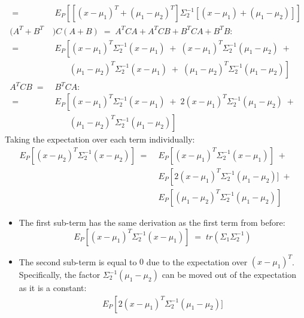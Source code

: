 \documentclass[12pt]{report}
\begin{document}
\begin{itemize}
\begin{align*}
            \;=&\; E_P \left[ \left[(x - \mu_1)^T + (\mu_1 - \mu_2)^T\right]
                \Sigma_2^{-1} [(x - \mu_1) + (\mu_1 - \mu_2)] \right] \\[2ex]
            (A^T + B^T&)C(A + B) \;=\; A^TCA + A^TCB + B^TCA + B^TB: \\[2ex]
            \;=&\; E_P \left[ (x - \mu_1)^T\Sigma_2^{-1}(x - \mu_1) \;+\;
                (x - \mu_1)^T\Sigma_2^{-1}(\mu_1 - \mu_2) \;+ \right. \\[2ex]
                & \quad\;\;\;\,
                \left. (\mu_1 - \mu_2)^T\Sigma_2^{-1}(x - \mu_1) \;+\; 
                (\mu_1 - \mu_2)^T\Sigma_2^{-1}(\mu_1 - \mu_2) \right] \\[2ex]
            A^TCB \;=&\; B^TCA: \\[2ex]
            \;=&\; E_P \left[ (x - \mu_1)^T\Sigma_2^{-1}(x - \mu_1) \;+\;
                2(x - \mu_1)^T\Sigma_2^{-1}(\mu_1 - \mu_2) \;+ \right. \\[2ex]
                & \quad\;\;\;\,
                \left. (\mu_1 - \mu_2)^T\Sigma_2^{-1}(\mu_1 - \mu_2) \right]
        \end{align*}
        \clearpage
        Taking the expectation over each term individually:
        \begin{align*}
            E_P \left[ (x - \mu_2)^T\Sigma_2^{-1} (x - \mu_2) \right]
            \;=\; &E_P \left[ (x - \mu_1)^T\Sigma_2^{-1}(x - \mu_1) \right] \;+\\[2ex]
                  &E_P \left[ 2(x - \mu_1)^T\Sigma_2^{-1}(\mu_1 - \mu_2) \right.]\;+\\[2ex]
                  &E_P \left[ (\mu_1 - \mu_2)^T\Sigma_2^{-1}(\mu_1 - \mu_2) \right]
        \end{align*}
        \begin{itemize}
            \item The first sub-term has the same derivation as the first term from before:
                $$E_P \left[ (x - \mu_1)^T\Sigma_2^{-1}(x - \mu_1) \right] \;=\;
                    tr(\Sigma_1\Sigma_2^{-1})$$
            \item The second sub-term is equal to $0$ due to the expectation over
                $(x - \mu_1)^T$. Specifically, the factor $\Sigma_2^{-1}(\mu_1 - \mu_2)$
                can be moved out of the expectation as it is a constant:
                \begin{align*}
                    E_P \left[ 2(x - \mu_1)^T\Sigma_2^{-1}(\mu_1 - \mu_2) \right.]

\end{align*}
\end{itemize}
\end{itemize}
\end{document}
